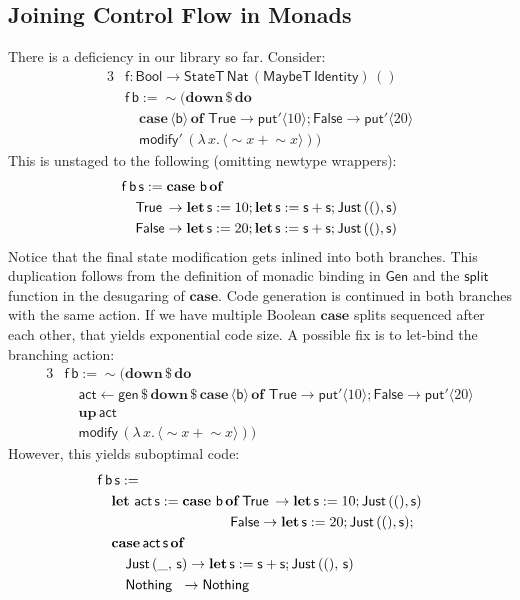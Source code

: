 \documentclass[acmsmall,screen]{acmart}
\newcommand{\mit}[1]{{\mathsf{#1}}}
\newcommand{\msf}[1]{{\mathsf{#1}}}
\newcommand{\mbf}[1]{{\mathbf{#1}}}
\newcommand{\bs}[1]{\boldsymbol{#1}}
\newcommand{\mdo}{\mbf{do}\,}
\newcommand{\ind}{\hspace{1em}}
\newcommand{\of}{\mbf{of}\,}
\newcommand{\letdef}{\mbf{let\,}}
\newcommand{\vb}{\mathsf{b}}
\newcommand{\vf}{\mathsf{f}}
\newcommand{\vs}{\mathsf{s}}
\newcommand{\Bool}{\msf{Bool}}
\newcommand{\fro}{\leftarrow}
\newcommand{\case}{\mbf{case\,}}
\newcommand{\spl}{{\bs{\sim}}}
\newcommand{\ql}{{\bs{\langle}}}
\newcommand{\qr}{{\bs{\rangle}}}
\newcommand{\True}{\msf{True}}
\newcommand{\False}{\msf{False}}
\newcommand{\Nat}{\msf{Nat}}
\newcommand{\MaybeT}{\msf{MaybeT}}
\newcommand{\Nothing}{\msf{Nothing}}
\newcommand{\Just}{\msf{Just}}
\theoremstyle{remark}
\newcommand{\mup}{\mbf{up}}
\newcommand{\mdown}{\mbf{down}}
\newcommand{\Gen}{\msf{Gen}}
\newcommand{\gen}{\mit{gen}}
\newcommand{\qt}[1]{\ql#1\qr}
\newcommand{\StateT}{\msf{StateT}}
\newcommand{\Identity}{\msf{Identity}}
\newcommand{\dlr}{\,\$\,}
\newcommand{\modify}{\mit{modify}}
\newcommand{\mput}{\mit{put}}
\begin{document}
\subsection{Joining Control Flow in Monads}\label{sec:joining-control-flow-in-monads}

There is a deficiency in our library so far. Consider:
\begin{alignat*}{3}
  & \vf : \Bool \to \StateT\,\Nat\,(\MaybeT\,\Identity)\,()\\
  & \vf\,\vb := \spl(\mdown \dlr \mdo \\
  & \ind \case \qt{\vb}\,\of\,\True\to \mput' \qt{10}; \False \to \mput' \qt{20}\\
  & \ind\modify'\,(\lambda\,x.\,\qt{\spl x + \spl x}))
\end{alignat*}
This is unstaged to the following (omitting newtype wrappers):
\begin{alignat*}{3}
  & \vf\,\vb\,\vs := \case\,\vb\,\of \\
  & \ind \True\hspace{0.2em} \to \letdef \vs := 10; \letdef \vs := \vs + \vs; \Just\,((),\vs)\\
  & \ind \False \to \letdef \vs := 20; \letdef \vs := \vs + \vs; \Just\,((),\vs)
\end{alignat*}
Notice that the final state modification gets inlined into both branches. This
duplication follows from the definition of monadic binding in $\Gen$ and the
$\mit{split}$ function in the desugaring of $\mbf{case}$. Code generation is
continued in both branches with the same action. If we have multiple Boolean
$\mbf{case}$ splits sequenced after each other, that yields exponential code
size. A possible fix is to let-bind the branching action:
\begin{alignat*}{3}
  & \vf\,\vb := \spl(\mdown \dlr \mdo \\
  & \ind \msf{act} \fro \gen \dlr \mdown \dlr \case \qt{\vb}\,\of\,\True\to \mput' \qt{10}; \False \to \mput' \qt{20} \\
  & \ind \mup\,\msf{act} \\
  & \ind\modify\,(\lambda\,x.\,\qt{\spl x + \spl x}))
\end{alignat*}
However, this yields suboptimal code:
\begin{alignat*}{3}
  & \vf\,\vb\,\vs :=\\
  & \ind \letdef\,\msf{act}\,\vs := \case\,\vb\,\of \True\hspace{0.2em}\to \letdef \vs := 10; \Just\,((), \vs)\\
  & \ind\hspace{8.5em}                               \False \to \letdef \vs := 20; \Just\,((), \vs);\\
  & \ind \case \msf{act}\,\vs\,\of\\
  & \ind\ind \Just\,(\_,\,\vs) \to \letdef \vs := \vs + \vs; \Just\,((),\,\vs)\\
  & \ind\ind \Nothing\hspace{0.6em} \to \Nothing
\end{alignat*}
\end{document}
